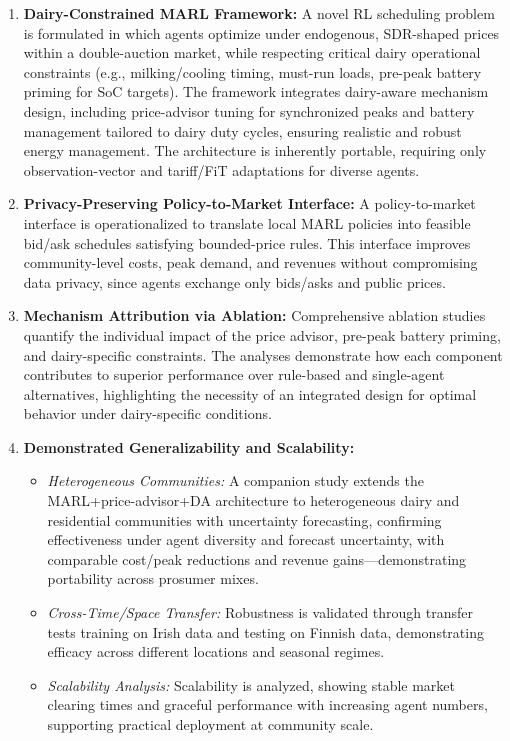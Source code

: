 \documentclass[preprint,12pt]{elsarticle}
\begin{document}
\begin{enumerate}
    \item \textbf{Dairy-Constrained MARL Framework:} A novel RL scheduling problem is formulated in which agents optimize under endogenous, SDR-shaped prices within a double-auction market, while respecting critical dairy operational constraints (e.g., milking/cooling timing, must-run loads, pre-peak battery priming for SoC targets). The framework integrates dairy-aware mechanism design, including price-advisor tuning for synchronized peaks and battery management tailored to dairy duty cycles, ensuring realistic and robust energy management. The architecture is inherently portable, requiring only observation-vector and tariff/FiT adaptations for diverse agents.
    
    \item \textbf{Privacy-Preserving Policy-to-Market Interface:} A policy-to-market interface is operationalized to translate local MARL policies into feasible bid/ask schedules satisfying bounded-price rules. This interface improves community-level costs, peak demand, and revenues without compromising data privacy, since agents exchange only bids/asks and public prices.
    
    \item \textbf{Mechanism Attribution via Ablation:} Comprehensive ablation studies quantify the individual impact of the price advisor, pre-peak battery priming, and dairy-specific constraints. The analyses demonstrate how each component contributes to superior performance over rule-based and single-agent alternatives, highlighting the necessity of an integrated design for optimal behavior under dairy-specific conditions.
    
    \item \textbf{Demonstrated Generalizability and Scalability:}
    \begin{itemize}
        \item \textit{Heterogeneous Communities:} A companion study \cite{shah2025uncertainty} extends the MARL+price-advisor+DA architecture to heterogeneous dairy and residential communities with uncertainty forecasting, confirming effectiveness under agent diversity and forecast uncertainty, with comparable cost/peak reductions and revenue gains—demonstrating portability across prosumer mixes.
        \item \textit{Cross-Time/Space Transfer:} Robustness is validated through transfer tests training on Irish data and testing on Finnish data, demonstrating efficacy across different locations and seasonal regimes.
        \item \textit{Scalability Analysis:} Scalability is analyzed, showing stable market clearing times and graceful performance with increasing agent numbers, supporting practical deployment at community scale.
    \end{itemize}
    

\end{enumerate}
\end{document}
